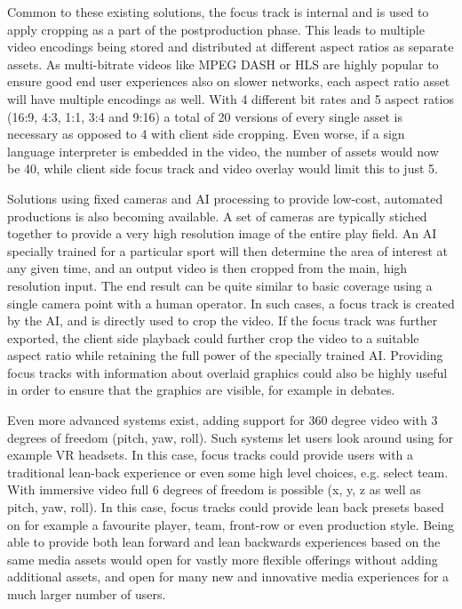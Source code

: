 \documentclass[sigconf, review=false]{acmart}
\begin{document}
Common to these existing solutions, the focus track is internal and is used to
apply cropping as a part of the postproduction phase. This leads to multiple
video encodings being stored and distributed at different aspect ratios as
separate assets. As multi-bitrate videos like MPEG DASH or HLS are highly
popular to ensure good end user experiences also on slower networks, each
aspect ratio asset will have multiple encodings as well. With 4 different bit
rates and 5 aspect ratios (16:9, 4:3, 1:1, 3:4 and 9:16) a total of 20
versions of every single asset is necessary as opposed to 4 with client side
cropping. Even worse, if a sign language interpreter is embedded in the
video, the number of assets would now be 40, while client side focus track
and video overlay would limit this to just 5.

Solutions using fixed cameras and AI processing to provide low-cost, automated
productions is also becoming available\cite{ai_sports}. A set of cameras are
typically stiched together to provide a very high resolution image of the
entire play field. An AI specially trained for a particular sport will then
determine the area of interest at any given time, and an output video is then
cropped from the main, high resolution input. The end result can be quite
similar to basic coverage using a single camera point with a human operator.
In such cases, a focus track is created by the AI, and is directly used to
crop the video. If the focus track was further exported, the client side
playback could further crop the video to a suitable aspect ratio while
retaining the full power of the specially trained AI. Providing focus tracks
with information about overlaid graphics could also be highly useful in order
to ensure that the graphics are visible, for example in debates.

Even more advanced systems exist, adding support for 360 degree video with 3
degrees of freedom (pitch, yaw, roll)\cite{8712670}. Such systems let users
look around using for example VR headsets. In this case, focus tracks could
provide users with a traditional lean-back experience or even some high level
choices, e.g. select team. With immersive video\cite
{yeung2020delivering} full 6 degrees of freedom is possible (x, y, z as well
as pitch, yaw, roll). In this case, focus tracks could provide lean back
presets based on for example a favourite player, team, front-row or even
production style. Being able to provide both lean forward and lean backwards
experiences based on the same media assets would open for vastly more
flexible offerings without adding additional assets, and open for many new
and innovative media experiences for a much larger number of users. 
\end{document}
